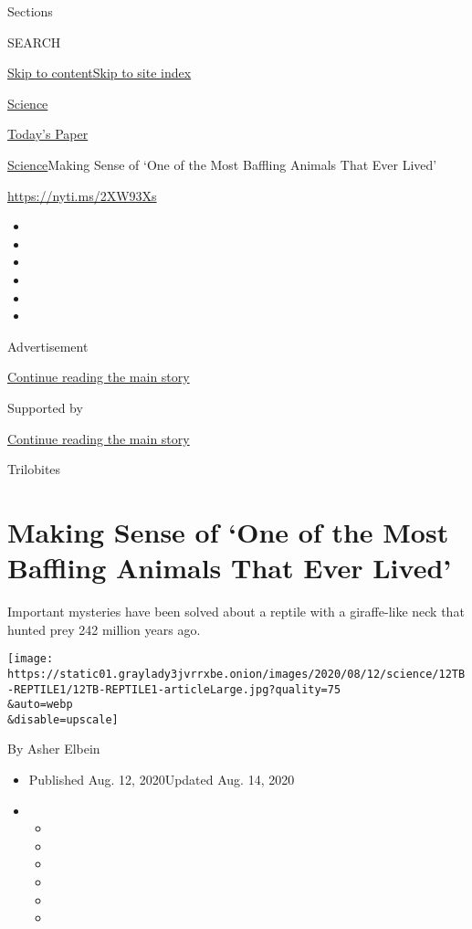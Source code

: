 Sections

SEARCH

\protect\hyperlink{site-content}{Skip to
content}\protect\hyperlink{site-index}{Skip to site index}

\href{https://www.nytimes3xbfgragh.onion/section/science}{Science}

\href{https://myaccount.nytimes3xbfgragh.onion/auth/login?response_type=cookie\&client_id=vi}{}

\href{https://www.nytimes3xbfgragh.onion/section/todayspaper}{Today's
Paper}

\href{/section/science}{Science}\textbar{}Making Sense of `One of the
Most Baffling Animals That Ever Lived'

\url{https://nyti.ms/2XW93Xs}

\begin{itemize}
\item
\item
\item
\item
\item
\item
\end{itemize}

Advertisement

\protect\hyperlink{after-top}{Continue reading the main story}

Supported by

\protect\hyperlink{after-sponsor}{Continue reading the main story}

Trilobites

\hypertarget{making-sense-of-one-of-the-most-baffling-animals-that-ever-lived}{%
\section{Making Sense of `One of the Most Baffling Animals That Ever
Lived'}\label{making-sense-of-one-of-the-most-baffling-animals-that-ever-lived}}

Important mysteries have been solved about a reptile with a giraffe-like
neck that hunted prey 242 million years ago.

\texttt{[image: https://static01.graylady3jvrrxbe.onion/images/2020/08/12/science/12TB-REPTILE1/12TB-REPTILE1-articleLarge.jpg?quality=75\\\&auto=webp\\\&disable=upscale]}

By Asher Elbein

\begin{itemize}
\item
  Published Aug. 12, 2020Updated Aug. 14, 2020
\item
  \begin{itemize}
  \item
  \item
  \item
  \item
  \item
  \item
  \end{itemize}
\end{itemize}

